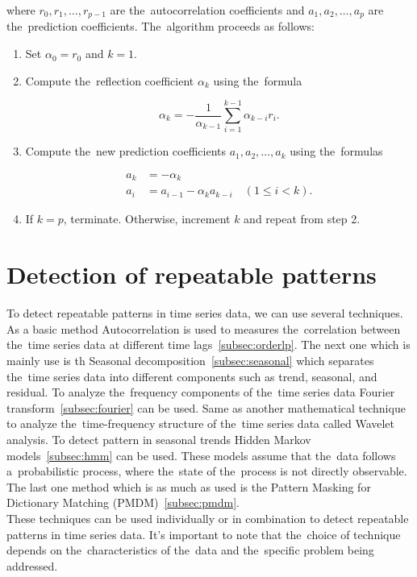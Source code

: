 where $r_0, r_1, \ldots, r_{p-1}$ are the~autocorrelation coefficients and $a_1, a_2, \ldots, a_p$ are the~prediction coefficients. The~algorithm proceeds as follows:\\

\begin{enumerate}
    \item Set $\alpha_0 = r_0$ and $k = 1$.
    \item Compute the~reflection coefficient $\alpha_k$ using the~formula

    \begin{equation*}
        \alpha_k = -\frac{1}{\alpha_{k-1}} \sum_{i=1}^{k-1} \alpha_{k-i} r_i.
    \end{equation*}

    \item Compute the~new prediction coefficients $a_1, a_2, \ldots, a_k$ using the~formulas

    \begin{align*}
        a_k &= -\alpha_k \\
        a_i &= a_{i-1} - \alpha_k a_{k-i} \quad (1 \leq i < k).
    \end{align*}

    \item If $k = p$, terminate. Otherwise, increment $k$ and repeat from step 2.
\end{enumerate}


\section{Detection of repeatable patterns}\label{sec:patterns}
To detect repeatable patterns in time series data, we can use several techniques. As a basic method Autocorrelation is used to measures the~correlation between the~time series data at different time lags~\ref{subsec:orderlp}. The next one which is mainly use is th Seasonal decomposition~\ref{subsec:seasonal} which separates the~time series data into different components
such as trend, seasonal, and residual. To analyze the~frequency components of the~time series data Fourier transform~\ref{subsec:fourier} can be used. Same as another mathematical technique to analyze the~time-frequency structure of the~time series data called Wavelet analysis.
To detect pattern in seasonal trends Hidden Markov models~\ref{subsec:hmm} can be used.
These models assume that the~data follows a~probabilistic process, where the~state of the~process is not directly observable. The last one method which is as much as used is the Pattern Masking for Dictionary Matching (PMDM)~\ref{subsec:pmdm}.\\
These techniques can be used individually or in combination to detect repeatable patterns in time series data. It's important to note that the~choice of technique depends on the~characteristics of the~data and the~specific problem being addressed.


